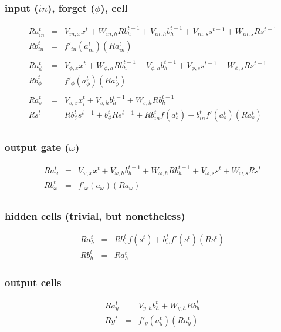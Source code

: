 \documentclass{article}
\begin{document}
\subsubsection{input ($in$), forget ($\phi$), cell}
\begin{eqnarray*}
Ra_{in}^t &=& V_{in,x}x^t + W_{in,h}Rb_h^{t-1}+ V_{in,h}b_h^{t-1} + V_{in,s}s^{t-1} + W_{in,s}Rs^{t-1} \\
Rb_{in}^t &=& f'_{in}(a_{in}^t)(Ra_{in}^t) \\
\\
Ra_{\phi}^t &=& V_{\phi, x}x^t + W_{\phi, h}Rb_h^{t-1} + V_{\phi, h}b_h^{t-1} + V_{\phi, s}s^{t-1} + W_{\phi, s}Rs^{t-1}\\
Rb_{\phi}^t &=& f'_{\phi}(a_{\phi}^t)(Ra_{\phi}^t) \\
\\
Ra_s^t &=& V_{s,x}x_i^t + V_{s,h}b_h^{t-1} + W_{s,h}Rb_h^{t-1} \\
Rs^t &=& Rb_{\phi}^ts^{t-1} + b_{\phi}^tRs^{t-1} + Rb_{in}^tf(a_s^t) + b_{in}^tf'(a_s^t)(Ra_s^t) \\  
\end{eqnarray*}

\subsubsection{output gate ($\omega$)}
\begin{eqnarray*}
Ra_{\omega}^t &=& V_{\omega,x}x^t + V_{\omega,h}b_h^{t-1} + W_{\omega,h}Rb_h^{t-1} + V_{\omega,s}s^t + W_{\omega,s}Rs^t \\
Rb_{\omega}^t &=& f'_{\omega}(a_{\omega})(Ra_{\omega}) \\
\end{eqnarray*}

\subsubsection{hidden cells (trivial, but nonetheless)}
\begin{eqnarray*}
Ra_h^t &=& Rb_{\omega}^t f(s^t)+b_{\omega}^t f'(s^t)(Rs^t) \\
Rb_h^t &=& Ra_h^t 
\end{eqnarray*}

\subsubsection{output cells}
\begin{eqnarray*}
Ra_y^t &=& V_{y,h}b_h^t + W_{y,h}Rb_h^t \\
Ry^t &=& f'_y(a_y^t)(Ra_y^t) 
\end{eqnarray*}
\end{document}
